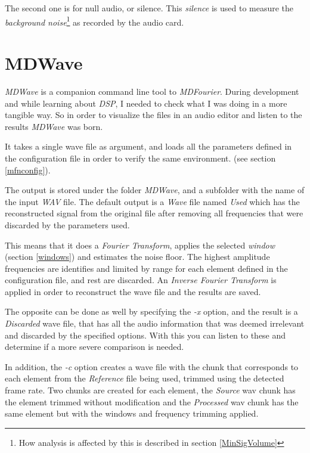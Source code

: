 \documentclass[10pt,a4paper]{report}
\begin{document}
\begin{appendices}
The second one is for null audio, or silence. This \textit{silence} is used to measure the \textit{background noise}\footnote{How analysis is affected by this is described in section \ref{MinSigVolume}} as recorded by the audio card. 	
	
\chapter{MDWave}
\label{mdwave}

\textit{MDWave} is a companion command line tool to \textit{MDFourier}. During development and while learning about \textit{DSP}, I needed to check what I was doing in a more tangible way. So in order to visualize the files in an audio editor and listen to the results \textit{MDWave} was born.

It takes a single wave file as argument, and loads all the parameters defined in the configuration file in order to verify the same environment. (see section \ref{mfnconfig}).

The output is stored under the folder \textit{MDWave}, and a subfolder with the name of the input \textit{WAV} file. The default output is a \textit{Wave} file named \textit{Used} which has the reconstructed signal from the original file after removing all frequencies that were discarded by the parameters used.

This means that it does a \textit{Fourier Transform}, applies the selected \textit{window} (section \ref{windows}) and estimates the noise floor. The highest amplitude frequencies are identifies and limited by range for each element defined in the configuration file, and rest are discarded. An \textit{Inverse Fourier Transform} is applied in order to reconstruct the wave file and the results are saved.

The opposite can be done as well by specifying the \textit{-x} option, and the result is a \textit{Discarded} wave file, that has all the audio information that was deemed irrelevant and discarded by the specified options. With this you can listen to these and determine if a more severe comparison is needed.

In addition, the \textit{-c} option creates a wave file with the chunk that corresponds to each element from the \textit{Reference} file being used, trimmed using the detected frame rate. Two chunks are created for each element, the \textit{Source} wav chunk has the element trimmed without modification and the \textit{Processed} wav chunk has the same element but with the windows and frequency trimming applied.


\end{appendices}
\end{document}
